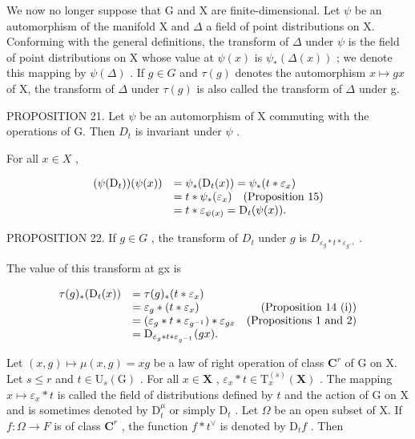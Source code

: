 We now no longer suppose that G and X are finite-dimensional. Let \(\psi\) be an automorphism of the manifold X and \(\Delta\) a field of point distributions on X. Conforming with the general definitions, the transform of \(\Delta\) under \(\psi\) is the field of point distributions on X whose value at \(\psi(x)\) is \(\psi_{*}(\Delta(x))\) ; we denote this mapping by \(\psi(\Delta)\) . If \(g \in G\) and \(\tau(g)\) denotes the automorphism \(x \mapsto gx\) of X, the transform of \(\Delta\) under \(\tau(g)\) is also called the transform of \(\Delta\) under g.

PROPOSITION 21. Let \(\psi\) be an automorphism of X commuting with the operations of G. Then \(D_{t}\) is invariant under \(\psi\) .

For all \(x \in X\) ,

\[
\begin{array}{r l} (\psi (\mathrm{D} _ {t})) (\psi (x)) & = \psi_ {*} (\mathrm{D} _ {t} (x)) = \psi_ {*} (t * \varepsilon_ {x}) \\ & = t * \psi_ {*} (\varepsilon_ {x}) \quad \text {(Proposition 15)} \\ & = t * \varepsilon_ {\psi (x)} = \mathrm{D} _ {t} (\psi (x)). \end{array}
\]

PROPOSITION 22. If \(g \in G\) , the transform of \(D_t\) under \(g\) is \(D_{\varepsilon_g * t * \varepsilon_{g^{-1}}}\) .

The value of this transform at gx is

\[
\begin{array}{r l r} \tau (g) _ {*} (\mathrm{D} _ {t} (x)) & = \tau (g) _ {*} (t * \varepsilon_ {x}) \\ & = \varepsilon_ {g} * (t * \varepsilon_ {x}) & \text {(Proposition 14 (i))} \\ & = (\varepsilon_ {g} * t * \varepsilon_ {g^{-1}}) * \varepsilon_ {g x} & \text {(Propositions 1 and 2)} \\ & = \mathrm{D} _ {\varepsilon_ {g} * t * \varepsilon_ {g^{-1}}} (g x). \end{array}
\]

Let \((x,g)\mapsto \mu (x,g) = xg\) be a law of right operation of class \(\mathbf{C}^r\) of G on X. Let \(s\leqslant r\) and \(t\in \mathrm{U}_{s}(\mathrm{G})\) . For all \(x\in \mathbf{X}\) , \(\varepsilon_{x}*t\in \mathrm{T}_{x}^{(s)}(\mathbf{X})\) . The mapping \(x\mapsto \varepsilon_x*t\) is called the field of distributions defined by \(t\) and the action of G on X and is sometimes denoted by \(\mathrm{D}_{t}^{\mu}\) or simply \(\mathrm{D}_t\) . Let \(\Omega\) be an open subset of X. If \(f:\Omega \to F\) is of class \(\mathbf{C}^r\) , the function \(f*t^{\vee}\) is denoted by \(\mathrm{D}_t f\) . Then

